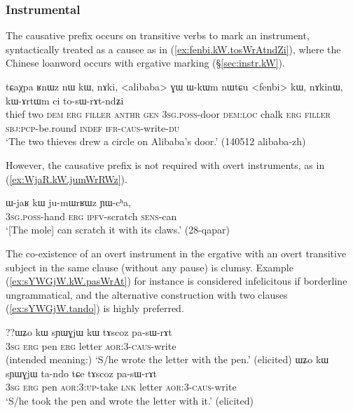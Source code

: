 \subsubsection{Instrumental} \label{sec:sig.caus.instrumental}
 
The causative prefix occurs on transitive verbs to mark an instrument, syntactically treated as a causee as in (\ref{ex:fenbi.kW.tosWrAtndZi}), where the Chinese loanword  occurs with ergative marking (§\ref{sec:instr.kW}). 

\begin{exe}
\ex \label{ex:fenbi.kW.tosWrAtndZi}
\gll tɕaχpa ʁnɯz nɯ kɯ, nɤki, <alibaba> ɣɯ ɯ-kɯm nɯtɕu <fenbi> kɯ, nɤkinɯ, kɯ-ɤrtɯm ci to-sɯ-rɤt-ndʑi \\
thief two \textsc{dem} \textsc{erg} \textsc{filler}  \textsc{anthr} \textsc{gen} \textsc{3sg}.\textsc{poss}-door \textsc{dem}:\textsc{loc} chalk \textsc{erg} \textsc{filler} \textsc{sbj}:\textsc{pcp}-be.round \textsc{indef} \textsc{ifr}-\textsc{caus}-write-\textsc{du} \\
\glt `The two thieves drew a circle on Alibaba's door.' (140512 alibaba-zh)
\end{exe}

However, the causative prefix is not required with overt instruments, as in (\ref{ex:WjaR.kW.jumWrRWz}).

\begin{exe}
\ex \label{ex:WjaR.kW.jumWrRWz}
\gll ɯ-jaʁ kɯ ju-mɯrʁɯz ɲɯ-cʰa, \\
\textsc{3sg}.\textsc{poss}-hand \textsc{erg} \textsc{ipfv}-scratch \textsc{sens}-can \\
\glt `[The mole] can scratch it with its claws.' (28-qapar)
\end{exe}

The co-existence of an overt instrument in the ergative with an overt transitive subject in the same clause (without any pause) is clumsy. Example (\ref{ex:sYWGjW.kW.pasWrAt}) for instance is considered infelicitous if borderline ungrammatical, and the alternative construction with two clauses (\ref{ex:sYWGjW.tando}) is highly preferred.

\begin{exe}
\ex 
\begin{xlist}
\ex \label{ex:sYWGjW.kW.pasWrAt}
\gll ??ɯʑo kɯ sɲɯɣjɯ kɯ tɤscoz pa-sɯ-rɤt \\
\textsc{3sg} \textsc{erg} pen \textsc{erg} letter \textsc{aor}:3\flobv{}-\textsc{caus}-write \\
\glt (intended meaning:) `S/he wrote the letter with the pen.' (elicited)
\ex \label{ex:sYWGjW.tando}
\gll ɯʑo kɯ sɲɯɣjɯ ta-ndo tɕe tɤscoz pa-sɯ-rɤt\\
\textsc{3sg} \textsc{erg} pen \textsc{aor}:3\flobv{}:\textsc{up}-take \textsc{lnk} letter \textsc{aor}:3\flobv{}-\textsc{caus}-write\\
\glt `S/he took the pen and wrote the letter with it.' (elicited)
\end{xlist}
\end{exe}

